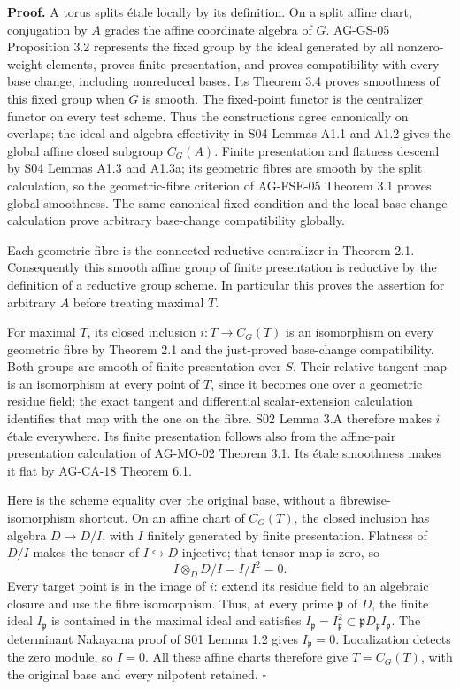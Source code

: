 \documentclass[11pt,a4paper,openany]{report}
\begin{document}
\textbf{Proof.} A torus splits étale locally by its definition. On a split affine chart, conjugation by \(A\) grades the affine coordinate algebra of \(G\). AG-GS-05 Proposition 3.2 represents the fixed group by the ideal generated by all nonzero-weight elements, proves finite presentation, and proves compatibility with every base change, including nonreduced bases. Its Theorem 3.4 proves smoothness of this fixed group when \(G\) is smooth. The fixed-point functor is the centralizer functor on every test scheme. Thus the constructions agree canonically on overlaps; the ideal and algebra effectivity in S04 Lemmas A1.1 and A1.2 gives the global affine closed subgroup \(C_G(A)\). Finite presentation and flatness descend by S04 Lemmas A1.3 and A1.3a; its geometric fibres are smooth by the split calculation, so the geometric-fibre criterion of AG-FSE-05 Theorem 3.1 proves global smoothness. The same canonical fixed condition and the local base-change calculation prove arbitrary base-change compatibility globally.

Each geometric fibre is the connected reductive centralizer in Theorem 2.1. Consequently this smooth affine group of finite presentation is reductive by the definition of a reductive group scheme. In particular this proves the assertion for arbitrary \(A\) before treating maximal \(T\).

For maximal \(T\), its closed inclusion \(i:T\to C_G(T)\) is an isomorphism on every geometric fibre by Theorem 2.1 and the just-proved base-change compatibility. Both groups are smooth of finite presentation over \(S\). Their relative tangent map is an isomorphism at every point of \(T\), since it becomes one over a geometric residue field; the exact tangent and differential scalar-extension calculation identifies that map with the one on the fibre. S02 Lemma 3.A therefore makes \(i\) étale everywhere. Its finite presentation follows also from the affine-pair presentation calculation of AG-MO-02 Theorem 3.1. Its étale smoothness makes it flat by AG-CA-18 Theorem 6.1.

Here is the scheme equality over the original base, without a fibrewise-isomorphism shortcut. On an affine chart of \(C_G(T)\), the closed inclusion has algebra \(D\to D/I\), with \(I\) finitely generated by finite presentation. Flatness of \(D/I\) makes the tensor of \(I\hookrightarrow D\) injective; that tensor map is zero, so \[
 I\otimes_D D/I=I/I^2=0.
\] Every target point is in the image of \(i\): extend its residue field to an algebraic closure and use the fibre isomorphism. Thus, at every prime \(\mathfrak p\) of \(D\), the finite ideal \(I_{\mathfrak p}\) is contained in the maximal ideal and satisfies \(I_{\mathfrak p}=I_{\mathfrak p}^2\subset\mathfrak pD_{\mathfrak p}I_{\mathfrak p}\). The determinant Nakayama proof of S01 Lemma 1.2 gives \(I_{\mathfrak p}=0\). Localization detects the zero module, so \(I=0\). All these affine charts therefore give \(T=C_G(T)\), with the original base and every nilpotent retained. \(\square\)
\end{document}
